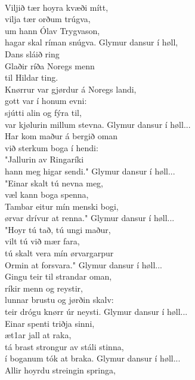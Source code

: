 \\
Viljið tær hoyra kvæði mítt,\\
vilja tær orðum trúgva,\\
um hann Ólav Trygvason,\\
hagar skal ríman snúgva.
\hops
{} Glymur dansur í høll,\\
 Dans sláið ring\\
 Glaðir ríða Noregs menn\\
 til Hildar ting.
\hops
{}\\
Knørrur var gjørdur á Noregs landi,\\
gott var í honum evni:\\
sjútti alin og fýra til,\\
var kjølurin millum stevna.
\hops
{} Glymur dansur í høll...
\hops
{}\\
Har kom maður á bergið oman\\
við sterkum boga í hendi:\\
"Jallurin av Ringaríki\\
hann meg higar sendi."
\hops
{} Glymur dansur í høll...
\hops
{}\\
"Einar skalt tú nevna meg,\\
væl kann boga spenna,\\
Tambar eitur mín menski bogi,\\
ørvar drívur at renna."
\hops
{} Glymur dansur í høll...
\hops
{}\\
"Hoyr tú tað, tú ungi maður,\\
vilt tú við mær fara,\\
tú skalt vera mín ørvargarpur\\
Ormin at forsvara."
\hops
{} Glymur dansur í høll...
\newpage
{}\\
Gingu teir til strandar oman,\\
ríkir menn og reystir,\\
lunnar brustu og jørðin skalv:\\
teir drógu knørr úr neysti.
\hops
{} Glymur dansur í høll...
\hops
{}\\
Einar spenti triðja sinni,\\
æt1ar jall at raka,\\
tá brast strongur av stáli stinna,\\
í boganum tók at braka.
\hops
{} Glymur dansur í høll...
\hops
{}\\
Allir hoyrdu streingin springa,\\
